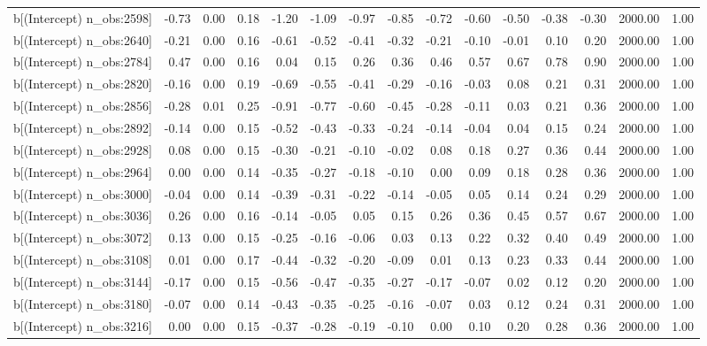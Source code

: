 \begin{table}[ht]
\begin{tabular}{rrrrrrrrrrrrrrr}
  b[(Intercept) n\_obs:2598] & -0.73 & 0.00 & 0.18 & -1.20 & -1.09 & -0.97 & -0.85 & -0.72 & -0.60 & -0.50 & -0.38 & -0.30 & 2000.00 & 1.00 \\ 
  b[(Intercept) n\_obs:2640] & -0.21 & 0.00 & 0.16 & -0.61 & -0.52 & -0.41 & -0.32 & -0.21 & -0.10 & -0.01 & 0.10 & 0.20 & 2000.00 & 1.00 \\ 
  b[(Intercept) n\_obs:2784] & 0.47 & 0.00 & 0.16 & 0.04 & 0.15 & 0.26 & 0.36 & 0.46 & 0.57 & 0.67 & 0.78 & 0.90 & 2000.00 & 1.00 \\ 
  b[(Intercept) n\_obs:2820] & -0.16 & 0.00 & 0.19 & -0.69 & -0.55 & -0.41 & -0.29 & -0.16 & -0.03 & 0.08 & 0.21 & 0.31 & 2000.00 & 1.00 \\ 
  b[(Intercept) n\_obs:2856] & -0.28 & 0.01 & 0.25 & -0.91 & -0.77 & -0.60 & -0.45 & -0.28 & -0.11 & 0.03 & 0.21 & 0.36 & 2000.00 & 1.00 \\ 
  b[(Intercept) n\_obs:2892] & -0.14 & 0.00 & 0.15 & -0.52 & -0.43 & -0.33 & -0.24 & -0.14 & -0.04 & 0.04 & 0.15 & 0.24 & 2000.00 & 1.00 \\ 
  b[(Intercept) n\_obs:2928] & 0.08 & 0.00 & 0.15 & -0.30 & -0.21 & -0.10 & -0.02 & 0.08 & 0.18 & 0.27 & 0.36 & 0.44 & 2000.00 & 1.00 \\ 
  b[(Intercept) n\_obs:2964] & 0.00 & 0.00 & 0.14 & -0.35 & -0.27 & -0.18 & -0.10 & 0.00 & 0.09 & 0.18 & 0.28 & 0.36 & 2000.00 & 1.00 \\ 
  b[(Intercept) n\_obs:3000] & -0.04 & 0.00 & 0.14 & -0.39 & -0.31 & -0.22 & -0.14 & -0.05 & 0.05 & 0.14 & 0.24 & 0.29 & 2000.00 & 1.00 \\ 
  b[(Intercept) n\_obs:3036] & 0.26 & 0.00 & 0.16 & -0.14 & -0.05 & 0.05 & 0.15 & 0.26 & 0.36 & 0.45 & 0.57 & 0.67 & 2000.00 & 1.00 \\ 
  b[(Intercept) n\_obs:3072] & 0.13 & 0.00 & 0.15 & -0.25 & -0.16 & -0.06 & 0.03 & 0.13 & 0.22 & 0.32 & 0.40 & 0.49 & 2000.00 & 1.00 \\ 
  b[(Intercept) n\_obs:3108] & 0.01 & 0.00 & 0.17 & -0.44 & -0.32 & -0.20 & -0.09 & 0.01 & 0.13 & 0.23 & 0.33 & 0.44 & 2000.00 & 1.00 \\ 
  b[(Intercept) n\_obs:3144] & -0.17 & 0.00 & 0.15 & -0.56 & -0.47 & -0.35 & -0.27 & -0.17 & -0.07 & 0.02 & 0.12 & 0.20 & 2000.00 & 1.00 \\ 
  b[(Intercept) n\_obs:3180] & -0.07 & 0.00 & 0.14 & -0.43 & -0.35 & -0.25 & -0.16 & -0.07 & 0.03 & 0.12 & 0.24 & 0.31 & 2000.00 & 1.00 \\ 
  b[(Intercept) n\_obs:3216] & 0.00 & 0.00 & 0.15 & -0.37 & -0.28 & -0.19 & -0.10 & 0.00 & 0.10 & 0.20 & 0.28 & 0.36 & 2000.00 & 1.00 \\ 

\end{tabular}
\end{table}
